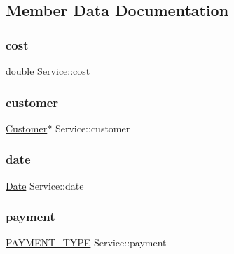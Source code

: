 \subsection{Member Data Documentation}
\hypertarget{classService_a2ce3309e0dff48b5fe242512df62784b}{}\label{classService_a2ce3309e0dff48b5fe242512df62784b} 
\subsubsection{\texorpdfstring{cost}{cost}}
{\footnotesize\ttfamily double Service\+::cost\hspace{0.3cm}{\ttfamily [private]}}

\hypertarget{classService_a1dbb66a7a35562c9f4b7f1654c286d75}{}\label{classService_a1dbb66a7a35562c9f4b7f1654c286d75} 
\subsubsection{\texorpdfstring{customer}{customer}}
{\footnotesize\ttfamily \hyperlink{classCustomer}{Customer}$\ast$ Service\+::customer\hspace{0.3cm}{\ttfamily [private]}}

\hypertarget{classService_a00e1fb44faf15d76b7633b888780baeb}{}\label{classService_a00e1fb44faf15d76b7633b888780baeb} 
\subsubsection{\texorpdfstring{date}{date}}
{\footnotesize\ttfamily \hyperlink{classDate}{Date} Service\+::date\hspace{0.3cm}{\ttfamily [private]}}

\hypertarget{classService_a832536bb266da871d50d14226bba3ac0}{}\label{classService_a832536bb266da871d50d14226bba3ac0} 
\subsubsection{\texorpdfstring{payment}{payment}}
{\footnotesize\ttfamily \hyperlink{Service_8h_a484d0c1796736fcbe8a3a730617b663f}{P\+A\+Y\+M\+E\+N\+T\+\_\+\+T\+Y\+PE} Service\+::payment\hspace{0.3cm}{\ttfamily [private]}}

